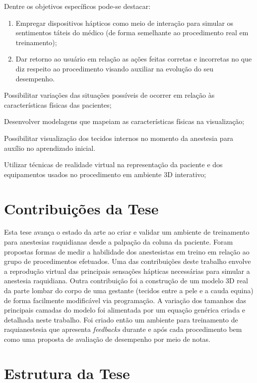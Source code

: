 Dentre os objetivos específicos pode-se destacar:
\begin{enumerate}
\item Empregar dispositivos hápticos como meio de interação para simular os sentimentos táteis do médico (de forma semelhante ao procedimento real em treinamento);
\item Dar retorno ao usuário em relação as ações feitas corretas e incorretas no que diz respeito ao procedimento visando auxiliar na evolução do seu desempenho.
\end{enumerate}
\item Possibilitar variações das situações possíveis de ocorrer em relação às características físicas das pacientes; 
\item Desenvolver modelagens que mapeiam as características físicas na visualização; 
\item Possibilitar visualização dos tecidos internos no momento da anestesia para auxílio no aprendizado inicial. 
\item Utilizar técnicas de realidade virtual na representação da paciente e dos equipamentos usados no procedimento em ambiente 3D interativo;

\section{Contribuições da Tese}
\label{sec:contribuicoes}

Esta tese avança o estado da arte ao criar e validar um ambiente de treinamento para anestesias raquidianas desde a palpação da coluna da paciente. Foram propostas formas de medir a habilidade dos anestesistas em treino em relação ao grupo de procedimentos efetuados. 
Uma das contribuições deste trabalho envolve a reprodução virtual das principais sensações hápticas necessárias para simular a anestesia raquidiana. Outra contribuição foi a construção de um modelo 3D real da parte lombar do corpo de uma gestante (tecidos entre a pele e a cauda equina) de forma facilmente modificável via programação. A variação dos tamanhos das principais camadas do modelo foi alimentada por um equação genérica criada e detalhada neste trabalho. Foi criado então um ambiente para treinamento de raquianestesia que apresenta \textit{feedbacks} durante e após cada
procedimento bem como uma proposta de avaliação de desempenho por meio de notas.

\section{Estrutura da Tese}
\label{sec:estrutura}

